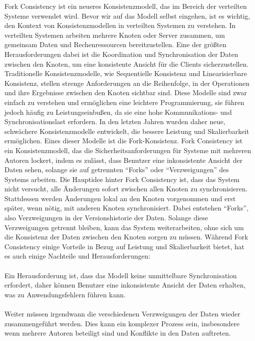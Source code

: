 \documentclass[../vs-script-first-v01.tex]{subfiles}
\begin{document}
Fork Consistency ist ein neueres Konsistenzmodell, das im Bereich der verteilten Systeme verwendet wird. Bevor wir auf das Modell selbst eingehen, ist es wichtig, den Kontext von Konsistenzmodellen in verteilten Systemen zu verstehen. In verteilten Systemen arbeiten mehrere Knoten oder Server zusammen, um gemeinsam Daten und Rechenressourcen bereitzustellen. Eine der größten Herausforderungen dabei ist die Koordination und Synchronisation der Daten zwischen den Knoten, um eine konsistente Ansicht für die Clients sicherzustellen.
Traditionelle Konsistenzmodelle, wie Sequentielle Konsistenz und Linearisierbare Konsistenz, stellen strenge Anforderungen an die Reihenfolge, in der Operationen und ihre Ergebnisse zwischen den Knoten sichtbar sind. Diese Modelle sind zwar einfach zu verstehen und ermöglichen eine leichtere Programmierung, sie führen jedoch häufig zu Leistungseinbußen, da sie eine hohe Kommunikations- und Synchronisationslast erfordern.
In den letzten Jahren wurden daher neue, schwächere Konsistenzmodelle entwickelt, die bessere Leistung und Skalierbarkeit ermöglichen. Eines dieser Modelle ist die Fork-Konsistenz. Fork Consistency ist ein Konsistenzmodell, das die Sicherheitsanforderungen für Systeme mit mehreren Autoren lockert, indem es zulässt, dass Benutzer eine inkonsistente Ansicht der Daten sehen, solange sie auf getrennten \enquote{Forks} oder \enquote{Verzweigungen} des Systems arbeiten.
Die Hauptidee hinter Fork Consistency ist, dass das System nicht versucht, alle Änderungen sofort zwischen allen Knoten zu synchronisieren. Stattdessen werden Änderungen lokal an den Knoten vorgenommen und erst später, wenn nötig, mit anderen Knoten synchronisiert. Dabei entstehen \enquote{Forks}, also Verzweigungen in der Versionshistorie der Daten. Solange diese Verzweigungen getrennt bleiben, kann das System weiterarbeiten, ohne sich um die Konsistenz der Daten zwischen den Knoten sorgen zu müssen.
Während Fork Consistency einige Vorteile in Bezug auf Leistung und Skalierbarkeit bietet, hat es auch einige Nachteile und Herausforderungen:
\\\\
Ein Herausforderung ist, dass das Modell keine unmittelbare Synchronisation erfordert, daher können Benutzer eine inkonsistente Ansicht der Daten erhalten, was zu Anwendungsfehlern führen kann.
\\\\
Weiter müssen irgendwann die verschiedenen Verzweigungen der Daten wieder zusammengeführt werden. Dies kann ein komplexer Prozess sein, insbesondere wenn mehrere Autoren beteiligt sind und Konflikte in den Daten auftreten.
\end{document}
